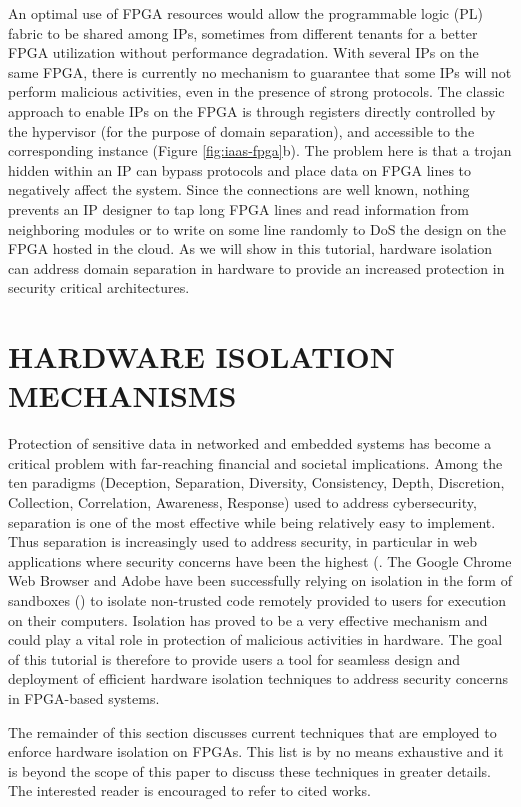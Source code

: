 \documentclass[sigconf]{acmart}
\theoremstyle{plain}
\theoremstyle{remark}
\begin{document}
An optimal use of FPGA resources would allow the programmable logic (PL) fabric to be shared among IPs, sometimes from different tenants for a better FPGA utilization without performance degradation. With several IPs on the same FPGA, there is currently no mechanism to guarantee that some IPs will not perform malicious activities, even in the presence of strong protocols. The classic approach to enable IPs on the FPGA is through registers directly controlled by the hypervisor (for the purpose of domain separation), and accessible to the corresponding instance (Figure \ref{fig:iaas-fpga}b). The problem here is that a trojan hidden within an IP can bypass protocols and place data on FPGA lines to negatively affect the system. Since the connections are well known, nothing prevents an IP designer to tap long FPGA lines and read information from neighboring modules or to write on some line randomly to DoS the design on the FPGA hosted in the cloud. As we will show in this tutorial, hardware isolation can address domain separation in hardware to provide an increased protection in security critical architectures.

\section{HARDWARE ISOLATION MECHANISMS} \label{sec:problem_definition}
Protection of sensitive data in networked and embedded systems has become a critical problem with far-reaching financial and societal implications. Among the ten paradigms (Deception, Separation, Diversity,  Consistency, Depth, Discretion, Collection, Correlation, Awareness, Response) used to address cybersecurity, separation is one of the most effective while being relatively easy to implement. Thus separation is increasingly used to address security, in particular in web applications where security concerns have been the highest (\cite{Mello2015,  JonesCU, Fireglass2016, Cottrell2017}. The Google Chrome Web Browser and Adobe have been successfully relying on isolation in the form of sandboxes (\cite{chromiumSB, adobeSB}) to isolate non-trusted code remotely provided to users for execution on their computers. Isolation has proved to be a very effective mechanism and could play a vital role in protection of malicious activities in hardware. The goal of this tutorial is therefore to provide users a tool for seamless design and deployment of efficient hardware isolation techniques to address security concerns in FPGA-based systems.

The remainder of this section discusses current techniques that are employed to enforce hardware isolation on FPGAs. This list is by no means exhaustive and it is beyond the scope of this paper to discuss these techniques in greater details. The interested reader is encouraged to refer to cited works.
\end{document}
